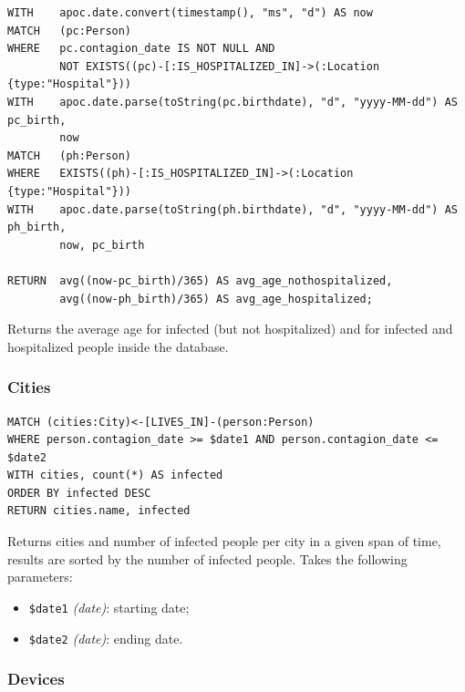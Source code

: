 \documentclass[12pt, a4paper]{article}
\begin{document}
\begin{tcolorbox}[fontupper=\scriptsize]
    \begin{verbatim}
WITH    apoc.date.convert(timestamp(), "ms", "d") AS now
MATCH   (pc:Person)
WHERE   pc.contagion_date IS NOT NULL AND
        NOT EXISTS((pc)-[:IS_HOSPITALIZED_IN]->(:Location {type:"Hospital"}))
WITH    apoc.date.parse(toString(pc.birthdate), "d", "yyyy-MM-dd") AS pc_birth,
        now
MATCH   (ph:Person)
WHERE   EXISTS((ph)-[:IS_HOSPITALIZED_IN]->(:Location {type:"Hospital"}))
WITH    apoc.date.parse(toString(ph.birthdate), "d", "yyyy-MM-dd") AS ph_birth,
        now, pc_birth

RETURN  avg((now-pc_birth)/365) AS avg_age_nothospitalized, 
        avg((now-ph_birth)/365) AS avg_age_hospitalized;
    \end{verbatim}
\end{tcolorbox}

\noindent %
Returns the average age for infected (but not hospitalized) and for infected 
and hospitalized people inside the database.

\subsubsection{Cities}

\begin{tcolorbox}[fontupper=\scriptsize]
    \begin{verbatim}
MATCH (cities:City)<-[LIVES_IN]-(person:Person) 
WHERE person.contagion_date >= $date1 AND person.contagion_date <= $date2
WITH cities, count(*) AS infected
ORDER BY infected DESC
RETURN cities.name, infected
    \end{verbatim}
\end{tcolorbox}

\noindent %
Returns cities and number of infected people per city in a given span of time, 
results are sorted by the number of infected people. 
Takes the following parameters: 
\begin{itemize}
    \item \texttt{\$date1} \emph{(date)}: starting date;
    \item \texttt{\$date2} \emph{(date)}: ending date.
\end{itemize}

\subsubsection{Devices}
\end{document}
